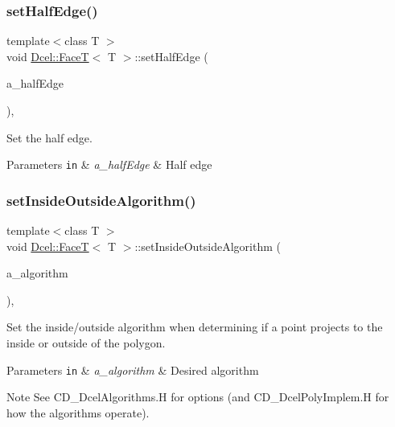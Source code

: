 \subsubsection{\texorpdfstring{set\+Half\+Edge()}{setHalfEdge()}}
{\footnotesize\ttfamily template$<$class T $>$ \\
void \hyperlink{classDcel_1_1FaceT}{Dcel\+::\+FaceT}$<$ T $>$\+::set\+Half\+Edge (\begin{DoxyParamCaption}\item[{const \hyperlink{classDcel_1_1FaceT_a0f3448c4cf108341e48029b8040c7cec}{Edge\+Ptr} \&}]{a\+\_\+half\+Edge }\end{DoxyParamCaption})\hspace{0.3cm}{\ttfamily [inline]}, {\ttfamily [noexcept]}}



Set the half edge. 


\begin{DoxyParams}[1]{Parameters}
\mbox{\tt in}  & {\em a\+\_\+half\+Edge} & Half edge \\
\hline
\end{DoxyParams}
\mbox{\label{classDcel_1_1FaceT_a12b6dc8412276137532a63c292e4b6fe}} 
\subsubsection{\texorpdfstring{set\+Inside\+Outside\+Algorithm()}{setInsideOutsideAlgorithm()}}
{\footnotesize\ttfamily template$<$class T $>$ \\
void \hyperlink{classDcel_1_1FaceT}{Dcel\+::\+FaceT}$<$ T $>$\+::set\+Inside\+Outside\+Algorithm (\begin{DoxyParamCaption}\item[{typename \hyperlink{classDcel_1_1Polygon2D}{Dcel\+::\+Polygon2D}$<$ T $>$\+::Inside\+Outside\+Algorithm \&}]{a\+\_\+algorithm }\end{DoxyParamCaption})\hspace{0.3cm}{\ttfamily [inline]}, {\ttfamily [noexcept]}}



Set the inside/outside algorithm when determining if a point projects to the inside or outside of the polygon. 


\begin{DoxyParams}[1]{Parameters}
\mbox{\tt in}  & {\em a\+\_\+algorithm} & Desired algorithm \\
\hline
\end{DoxyParams}
\begin{DoxyNote}{Note}
See C\+D\+\_\+\+Dcel\+Algorithms.\+H for options (and C\+D\+\_\+\+Dcel\+Poly\+Implem.\+H for how the algorithms operate). 
\end{DoxyNote}
\mbox{\label{classDcel_1_1FaceT_a8ac718b0c9af797d34efcda43f38b6c0}} 
